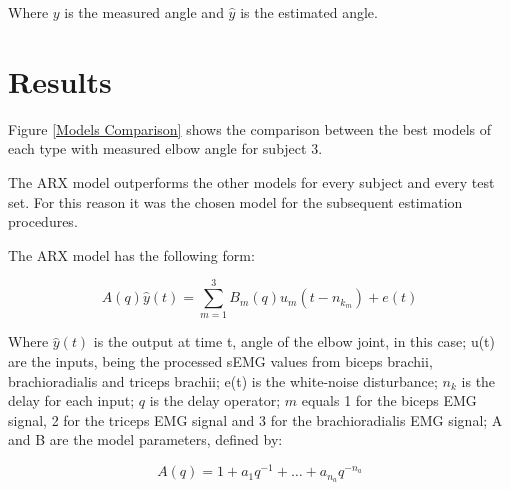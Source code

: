 \documentclass[letterpaper, 10 pt, conference]{ieeeconf}  %
\begin{document}
% 
% 

% 
% 

Where $y$ is the measured angle and $\hat{y}$ is the estimated angle.



\section{Results}

Figure \ref{Models Comparison} shows the comparison between the best models of each type with measured elbow angle for subject 3.

The ARX model outperforms the other models for every subject and every test set. For this reason it was the chosen model for the subsequent estimation procedures.

The ARX model has the following form:

\begin{equation}
\label{eq:ARX}
A(q)\hat{y}(t) = \sum_{m=1}^{3}B_m(q)u_m(t-n_{k_m})+e(t)
\end{equation}

Where \(\hat{y}(t)\) is the output at time t, angle of the elbow joint, in this case; u(t) are the inputs, being the processed sEMG values from biceps brachii, brachioradialis and triceps brachii; e(t) is the white-noise disturbance; \(n_k\)  is the delay for each input; \(q\) is the delay operator; \(m\) equals 1 for the biceps EMG signal, 2 for the triceps EMG signal and 3 for the brachioradialis EMG signal; A and B are the model parameters, defined by:

\begin{equation}
\label{eq:A}
A(q) = 1 + a_1q^{-1}+\dots+a_{n_a}q^{-n_a}
\end{equation}
\end{document}
